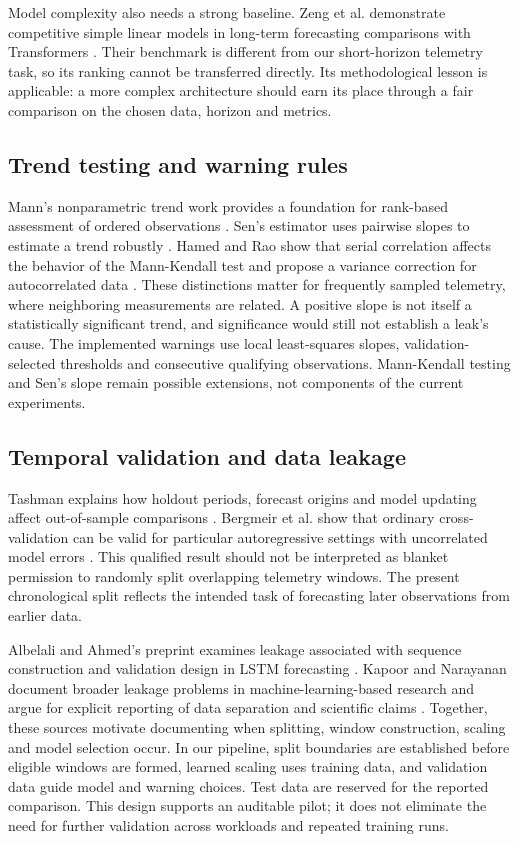 \documentclass[10pt,a4paper,twocolumn]{article}
\begin{document}
Model complexity also needs a strong baseline. Zeng et al. demonstrate competitive simple linear models in long-term forecasting comparisons with Transformers \cite{ref32}. Their benchmark is different from our short-horizon telemetry task, so its ranking cannot be transferred directly. Its methodological lesson is applicable: a more complex architecture should earn its place through a fair comparison on the chosen data, horizon and metrics.

\subsection{Trend testing and warning rules}

Mann's nonparametric trend work provides a foundation for rank-based assessment of ordered observations \cite{ref33}. Sen's estimator uses pairwise slopes to estimate a trend robustly \cite{ref34}. Hamed and Rao show that serial correlation affects the behavior of the Mann-Kendall test and propose a variance correction for autocorrelated data \cite{ref35}. These distinctions matter for frequently sampled telemetry, where neighboring measurements are related. A positive slope is not itself a statistically significant trend, and significance would still not establish a leak's cause. The implemented warnings use local least-squares slopes, validation-selected thresholds and consecutive qualifying observations. Mann-Kendall testing and Sen's slope remain possible extensions, not components of the current experiments.

\subsection{Temporal validation and data leakage}

Tashman explains how holdout periods, forecast origins and model updating affect out-of-sample comparisons \cite{ref36}. Bergmeir et al. show that ordinary cross-validation can be valid for particular autoregressive settings with uncorrelated model errors \cite{ref37}. This qualified result should not be interpreted as blanket permission to randomly split overlapping telemetry windows. The present chronological split reflects the intended task of forecasting later observations from earlier data.

Albelali and Ahmed's preprint examines leakage associated with sequence construction and validation design in LSTM forecasting \cite{ref38}. Kapoor and Narayanan document broader leakage problems in machine-learning-based research and argue for explicit reporting of data separation and scientific claims \cite{ref39}. Together, these sources motivate documenting when splitting, window construction, scaling and model selection occur. In our pipeline, split boundaries are established before eligible windows are formed, learned scaling uses training data, and validation data guide model and warning choices. Test data are reserved for the reported comparison. This design supports an auditable pilot; it does not eliminate the need for further validation across workloads and repeated training runs.
\end{document}
